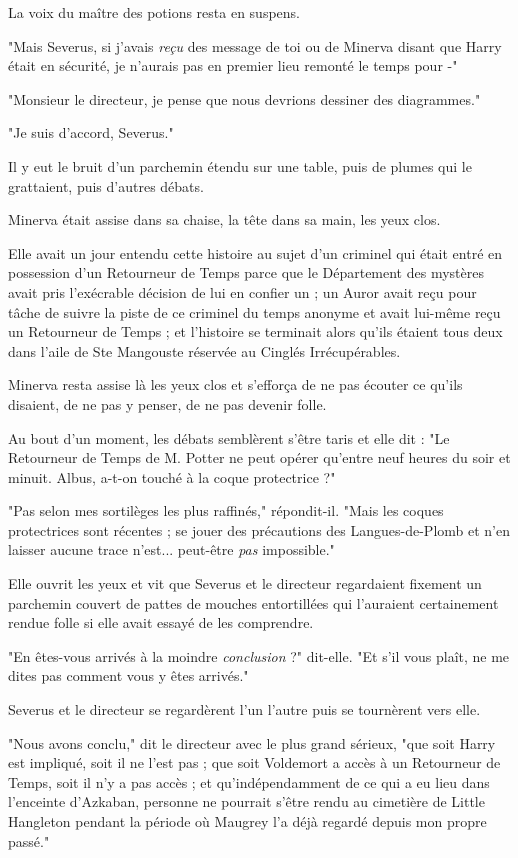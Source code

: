 La voix du maître des potions resta en suspens.

"Mais Severus, si j'avais \emph{reçu}  des message de toi ou de Minerva disant que Harry était en sécurité, je n'aurais pas en premier lieu remonté le temps pour -"

"Monsieur le directeur, je pense que nous devrions dessiner des diagrammes."

"Je suis d'accord, Severus."

Il y eut le bruit d'un parchemin étendu sur une table, puis de plumes qui le grattaient, puis d'autres débats.

Minerva était assise dans sa chaise, la tête dans sa main, les yeux clos.

Elle avait un jour entendu cette histoire au sujet d'un criminel qui était entré en possession d'un Retourneur de Temps parce que le Département des mystères avait pris l'exécrable décision de lui en confier un ; un Auror avait reçu pour tâche de suivre la piste de ce criminel du temps anonyme et avait lui-même reçu un Retourneur de Temps ; et l'histoire se terminait alors qu'ils étaient tous deux dans l'aile de Ste Mangouste réservée au Cinglés Irrécupérables.

Minerva resta assise là les yeux clos et s'efforça de ne pas écouter ce qu'ils disaient, de ne pas y penser, de ne pas devenir folle.

Au bout d'un moment, les débats semblèrent s'être taris et elle dit : "Le Retourneur de Temps de M. Potter ne peut opérer qu'entre neuf heures du soir et minuit. Albus, a-t-on touché à la coque protectrice ?"

"Pas selon mes sortilèges les plus raffinés," répondit-il. "Mais les coques protectrices sont récentes ; se jouer des précautions des Langues-de-Plomb et n'en laisser aucune trace n'est... peut-être \emph{pas}  impossible."

Elle ouvrit les yeux et vit que Severus et le directeur regardaient fixement un parchemin couvert de pattes de mouches entortillées qui l'auraient certainement rendue folle si elle avait essayé de les comprendre.

"En êtes-vous arrivés à la moindre \emph{conclusion}  ?" dit-elle. "Et s'il vous plaît, ne me dites pas comment vous y êtes arrivés."

Severus et le directeur se regardèrent l'un l'autre puis se tournèrent vers elle.

"Nous avons conclu," dit le directeur avec le plus grand sérieux, "que soit Harry est impliqué, soit il ne l'est pas ; que soit Voldemort a accès à un Retourneur de Temps, soit il n'y a pas accès ; et qu'indépendamment de ce qui a eu lieu dans l'enceinte d'Azkaban, personne ne pourrait s'être rendu au cimetière de Little Hangleton pendant la période où Maugrey l'a déjà regardé depuis mon propre passé."

